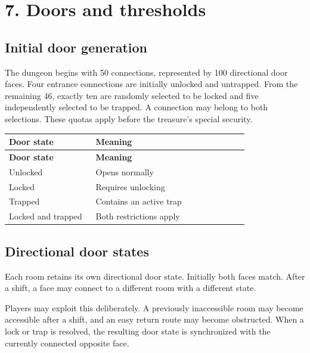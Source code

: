 \section{7. Doors and thresholds}

\subsection{Initial door generation}

The dungeon begins with 50 connections, represented by 100 directional door faces. Four entrance connections are initially unlocked and untrapped. From the remaining 46, exactly ten are randomly selected to be locked and five independently selected to be trapped. A connection may belong to both selections. These quotas apply before the treasure's special security.

\begin{longtable}{p{0.34\linewidth}p{0.6\linewidth}}

\rowcolor{tablehead} \textbf{Door state} & \textbf{Meaning} \\

\endfirsthead

\rowcolor{tablehead} \textbf{Door state} & \textbf{Meaning} \\

\endhead

Unlocked & Opens normally \\

Locked & Requires unlocking \\

Trapped & Contains an active trap \\

Locked and trapped & Both restrictions apply \\

\end{longtable}

\subsection{Directional door states}

Each room retains its own directional door state. Initially both faces match. After a shift, a face may connect to a different room with a different state.

\begin{center}\end{center}

Players may exploit this deliberately. A previously inaccessible room may become accessible after a shift, and an easy return route may become obstructed. When a lock or trap is resolved, the resulting door state is synchronized with the currently connected opposite face.

